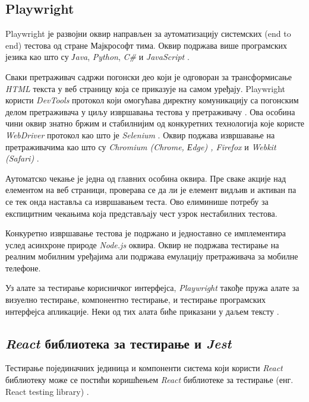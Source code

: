 \documentclass[12pt,oneside]{memoir}
\begin{document}
\subsection{Playwright}

Playwright је развојни оквир направљен за аутоматизацију системских (end to end) тестова од стране Мајкрософт тима. Оквир подржава више програмских језика као што су \textit{Јava}, \textit{Python}, \textit{C\#}  и \textit{JavaScript} \cite{playwright}.

Сваки претраживач садржи погонски део који је одговоран за трансформисање \textit{HTML} текста у веб страницу која се приказује на самом уређају. Playwright користи \textit{DevTools} протокол који омогућава директну комуникацију са погонским делом претраживача у циљу извршавања тестова у претраживачу \cite{playwrightTutorial}. Ова особина чини оквир знатно бржим и стабилнијим од конкуретних технологија које користе \textit{WebDriver} протокол као што је \textit{Selenium} \cite{playwrightVsSelenium} \cite{speedTest}. Оквир поджава извршавање на претраживачима као што су \textit{Chromium (Chrome, Еdge) , Firefox} и \textit{Webkit (Safari) }\cite{playwright} \cite{chromium} \cite{webKit}.

Аутоматско чекање је једна од главних особина оквира. Пре сваке акције над елементом на веб страници, проверава се да ли је елемент видљив и активан па се тек онда наставља са извршавањем теста. Ово елиминише потребу за експицитним чекањима која представљају чест узрок нестабилних тестова. 

Конкуретно извршавање тестова је подржано и једноставно се имплементира услед асинхроне природе \textit{Node.js} оквира. Оквир не подржава тестирање на реалним мобилним уређајима али подржава емулацију претраживача за мобилне телефоне.

Уз алате за тестирање корисничког интерфејса, \textit{Playwright} такође пружа алате за визуелно тестирање, компонентно тестирање, и тестирање програмских интерфејса апликације. Неки од тих алата биће приказани у даљем тексту \cite{playwright}.

\subsection{\textit{React} библиотека за тестирање и  \textit{Jest}}

Тестирање појединачних јединица и компоненти система који користи \textit{React} библиотеку може се постићи коришћењем \textit{React} библиотеке за тестирање (енг. React testing library) \cite{rtl}. 
\end{document}

